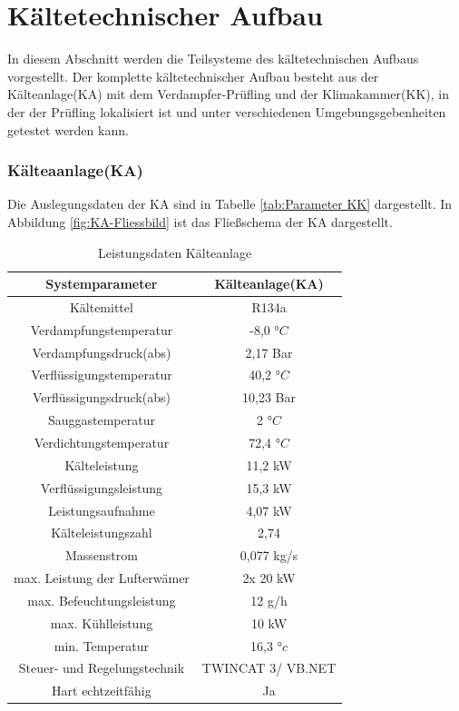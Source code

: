 \section{Kältetechnischer Aufbau}
\label{sec: Kältetechnischer Aufbau}

In diesem Abschnitt werden die Teilsysteme des kältetechnischen Aufbaus vorgestellt. Der komplette kältetechnischer Aufbau besteht aus der Kälteanlage(KA) mit dem Verdampfer-Prüfling und der Klimakammer(KK), in der der Prüfling lokalisiert ist und unter verschiedenen Umgebungsgebenheiten getestet werden kann.

\subsubsection{Kälteaanlage(KA)}
\label{subsec:Kälteanlage}



Die Auslegungsdaten der KA sind in Tabelle \ref{tab:Parameter KK} dargestellt. In Abbildung \ref{fig:KA-Fliessbild}  ist das Fließschema der KA dargestellt. 



\begin{table}[htb]
\centering
\caption{Leistungsdaten Kälteanlage}\vspace{6pt}
\label{tab:Parameter KK}
\begin{tabular}{cc}
\hline 
\textbf{Systemparameter} & \textbf{Kälteanlage(KA)} \\ 
\hline 
\hline
Kältemittel & R134a\\
\hline
Verdampfungstemperatur & -8,0 $°C$\\
\hline
Verdampfungsdruck(abs) & 2,17 Bar\\
\hline
Verflüssigungstemperatur & 40,2 $°C$\\
\hline
Verflüssigungsdruck(abs) & 10,23 Bar\\
\hline
Sauggastemperatur & 2 $°C$\\
\hline
Verdichtungstemperatur &72,4 $°C$\\
Kälteleistung & 11,2 kW \\ 
\hline 
Verflüssigungsleistung & 15,3 kW\\
\hline
Leistungsaufnahme & 4,07 kW \\ 
\hline
Kälteleistungszahl & 2,74\\
\hline 
Massenstrom & 0,077 kg/s \\ 
\hline 
max. Leistung der Lufterwämer & 2x 20 kW \\ 
\hline 
max. Befeuchtungsleistung & 12 g/h \\ 
\hline 
max. Kühlleistung & 10 kW \\ 
\hline 
min. Temperatur & 16,3 $°c$ \\ 
\hline 
Steuer- und Regelungstechnik & TWINCAT 3/ VB.NET \\ 
\hline 
Hart echtzeitfähig & Ja \\ 
\hline 
\end{tabular} 
\label{tab:KA-Auslegungsdaten}
\end{table}

